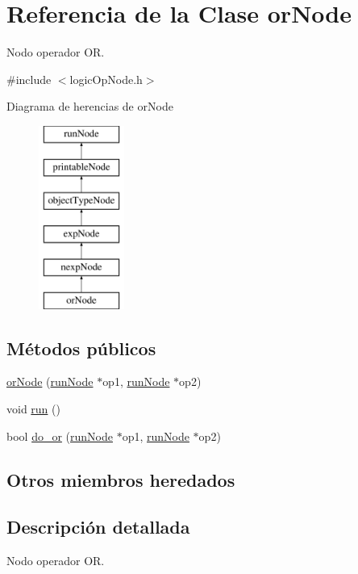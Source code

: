 \hypertarget{classorNode}{\section{Referencia de la Clase or\-Node}
\label{classorNode}
}


Nodo operador O\-R.  




{\ttfamily \#include $<$logic\-Op\-Node.\-h$>$}

Diagrama de herencias de or\-Node\begin{figure}[H]
\begin{center}
\leavevmode
\includegraphics[height=6.000000cm]{classorNode}
\end{center}
\end{figure}
\subsection*{Métodos públicos}
\begin{DoxyCompactItemize}
\item 
\hyperlink{classorNode_a29bb6481e2ea78693d3f4c2ff3c5d7af}{or\-Node} (\hyperlink{classrunNode}{run\-Node} $\ast$op1, \hyperlink{classrunNode}{run\-Node} $\ast$op2)
\item 
void \hyperlink{classorNode_a326d03128c3fd68b03749eb6d9c31ec3}{run} ()
\item 
bool \hyperlink{classorNode_ac77151e938ad86e4984215f7d41160d9}{do\-\_\-or} (\hyperlink{classrunNode}{run\-Node} $\ast$op1, \hyperlink{classrunNode}{run\-Node} $\ast$op2)
\end{DoxyCompactItemize}
\subsection*{Otros miembros heredados}


\subsection{Descripción detallada}
Nodo operador O\-R. 


